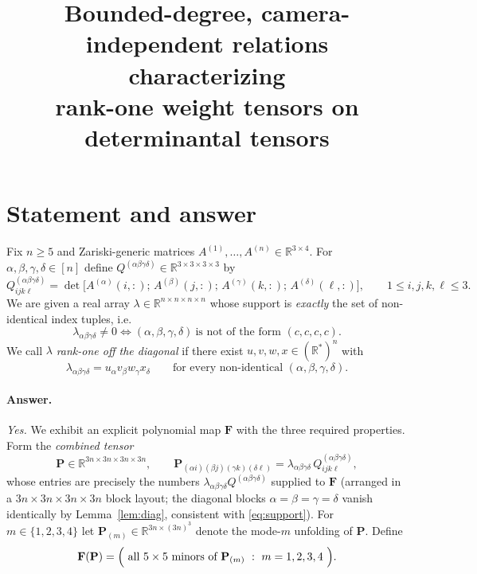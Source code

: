 \documentclass[12pt]{article}
\title{Bounded-degree, camera-independent relations characterizing\\ rank-one weight tensors on determinantal tensors}
\author{}
\date{}
\newcommand{\bR}{\mathbb{R}}
\theoremstyle{definition}
\begin{document}
\maketitle

\section{Statement and answer}

Fix $n\ge 5$ and Zariski-generic matrices
$A^{(1)},\dots,A^{(n)}\in\bR^{3\times 4}$.
For $\alpha,\beta,\gamma,\delta\in[n]$ define
$Q^{(\alpha\beta\gamma\delta)}\in\bR^{3\times3\times3\times3}$ by
\begin{equation}\label{eq:Qdef}
Q^{(\alpha\beta\gamma\delta)}_{ijk\ell}
=\det\bigl[A^{(\alpha)}(i,:);\,A^{(\beta)}(j,:);\,A^{(\gamma)}(k,:);\,A^{(\delta)}(\ell,:)\bigr],
\qquad 1\le i,j,k,\ell\le 3 .
\end{equation}
We are given a real array $\lambda\in\bR^{n\times n\times n\times n}$ whose support is
\emph{exactly} the set of non-identical index tuples, i.e.
\begin{equation}\label{eq:support}
\lambda_{\alpha\beta\gamma\delta}\neq 0
\iff (\alpha,\beta,\gamma,\delta)\ \text{is not of the form }(c,c,c,c).
\end{equation}
We call $\lambda$ \emph{rank-one off the diagonal} if there exist
$u,v,w,x\in(\bR^{*})^{n}$ with
\begin{equation}\label{eq:rankone}
\lambda_{\alpha\beta\gamma\delta}=u_\alpha v_\beta w_\gamma x_\delta
\qquad\text{for every non-identical }(\alpha,\beta,\gamma,\delta).
\end{equation}

\paragraph{Answer.} \emph{Yes.}  We exhibit an explicit polynomial map
$\mathbf F$ with the three required properties.  Form the
\emph{combined tensor}
\begin{equation}\label{eq:bigP}
\mathbf P\in\bR^{3n\times3n\times3n\times3n},
\qquad
\mathbf P_{(\alpha i)(\beta j)(\gamma k)(\delta\ell)}
=\lambda_{\alpha\beta\gamma\delta}\,Q^{(\alpha\beta\gamma\delta)}_{ijk\ell},
\end{equation}
whose entries are precisely the numbers
$\lambda_{\alpha\beta\gamma\delta}Q^{(\alpha\beta\gamma\delta)}$ supplied to $\mathbf F$
(arranged in a $3n\times3n\times3n\times3n$ block layout; the diagonal blocks
$\alpha=\beta=\gamma=\delta$ vanish identically by Lemma~\ref{lem:diag}, consistent
with \eqref{eq:support}).  For $m\in\{1,2,3,4\}$ let
$\mathbf P_{(m)}\in\bR^{3n\times(3n)^3}$ denote the mode-$m$ unfolding of
$\mathbf P$.  Define
\begin{equation}\label{eq:Fdef}
\mathbf F(\mathbf P)
=\Bigl(\ \text{all }5\times5\ \text{minors of }\mathbf P_{(m)}\ :\ m=1,2,3,4\ \Bigr).
\end{equation}
\end{document}
